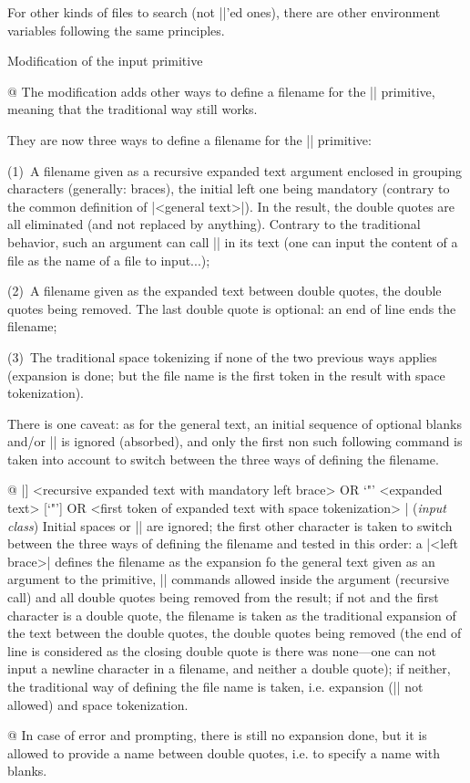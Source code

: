 For other kinds of files to search (not ||'ed ones), there are
other environment variables following the same principles.

\enddiv %

\begindiv Modification of the input primitive

@ The modification adds other ways to define a filename for the ||
primitive, meaning that the traditional way still works.

They are now three ways to define a filename for the || primitive:

(1)~A filename given as a recursive expanded text argument enclosed in
grouping characters (generally: braces), the initial left one being
mandatory (contrary to the common definition of |<general text>|). In
the result, the double quotes are all eliminated (and not replaced by
anything). Contrary to the traditional behavior, such an argument can
call || in its text (one can input the content of a file as the
name of a file to input...);

(2)~A filename given as the expanded text between double quotes, the
double quotes being removed. The last double quote is optional: an
end of line ends the filename;

(3)~The traditional space tokenizing if none of the two previous
ways applies (expansion is done; but the file name is the first token
in the result with space tokenization).

There is one caveat: as for the general text, an initial sequence of
optional blanks and/or |\relax| is ignored (absorbed), and only the
first non such following command is taken into account to switch
between the three ways of defining the filename.

@ |\relax*]
{ <recursive expanded text with mandatory left brace>
OR `"' <expanded text> [`"']
OR <first token of expanded text with space tokenization> }|
({\sl input class})\enskip
Initial spaces or |\relax| are ignored; the first other character is
taken to switch between the three ways of defining the filename and
tested in this order: a |<left brace>| defines the filename as the
expansion fo the general text given as an argument to the primitive,
|| commands allowed inside the argument (recursive call) and all
double quotes being removed from the result;
if not and the first character is a double quote, the filename is 
taken as the traditional expansion of the text between the double
quotes, the double quotes being removed (the end of line is considered
as the closing double quote is there was none---one can not input
a newline character in a filename, and neither a double quote); if
neither, the traditional way of defining the file name is taken,
i.e. expansion (|| not allowed) and space tokenization.

@ In case of error and prompting, there is still no expansion done, but
it is allowed to provide a name between double quotes, i.e. to specify
a name with blanks.

\enddiv %

\bye

